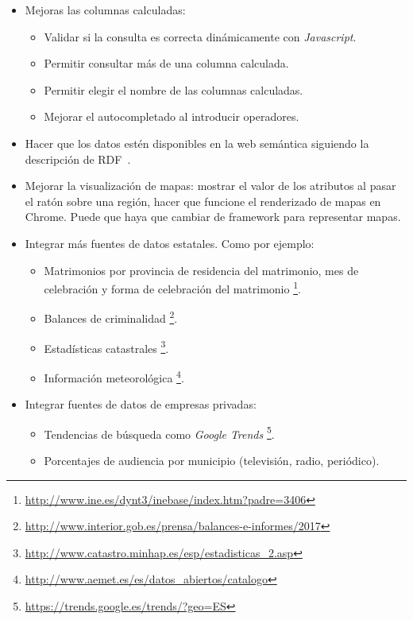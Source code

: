 \begin{itemize}
	\item Mejoras las columnas calculadas:
	\begin{itemize}
		\item Validar si la consulta es correcta dinámicamente con \textit{Javascript}.
		\item Permitir consultar más de una columna calculada.
		\item Permitir elegir el nombre de las columnas calculadas.
		\item Mejorar el autocompletado al introducir operadores.
	\end{itemize}
	\item Hacer que los datos estén disponibles en la web semántica siguiendo la descripción de RDF~\cite{misc:informationserviceengineering}.
	\item Mejorar la visualización de mapas: mostrar el valor de los atributos al pasar el ratón sobre una región, hacer que funcione el renderizado de mapas en Chrome. Puede que haya que cambiar de framework para representar mapas. 
	\item Integrar más fuentes de datos estatales. Como por ejemplo:
	\begin{itemize}
		\item Matrimonios por provincia de residencia del matrimonio, mes de celebración y forma de celebración del matrimonio
		\footnote{\href{http://www.ine.es/dynt3/inebase/index.htm?padre=3406}{http://www.ine.es/dynt3/inebase/index.htm?padre=3406}}.
		\item Balances de criminalidad
		\footnote{\href{http://www.interior.gob.es/prensa/balances-e-informes/2017}{http://www.interior.gob.es/prensa/balances-e-informes/2017}}.
		\item Estadísticas catastrales
		\footnote{\href{http://www.catastro.minhap.es/esp/estadisticas\_2.asp}{http://www.catastro.minhap.es/esp/estadisticas\_2.asp}}.
		\item Información meteorológica
		\footnote{\href{http://www.aemet.es/es/datos\_abiertos/catalogo}{http://www.aemet.es/es/datos\_abiertos/catalogo}}.
	\end{itemize}
	\item Integrar fuentes de datos de empresas privadas:
	\begin{itemize}
		\item Tendencias de búsqueda como \textit{Google Trends}
		\footnote{\href{https://trends.google.es/trends/?geo=ES}{https://trends.google.es/trends/?geo=ES}}.
		\item Porcentajes de audiencia por municipio (televisión, radio, periódico).
	\end{itemize}
\end{itemize}